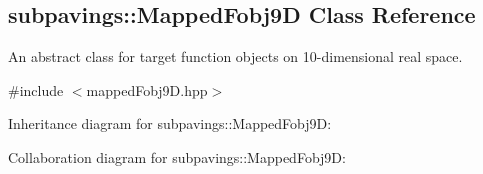 \hypertarget{classsubpavings_1_1MappedFobj9D}{\subsection{subpavings\-:\-:\-Mapped\-Fobj9\-D \-Class \-Reference}
\label{classsubpavings_1_1MappedFobj9D}
}


\-An abstract class for target function objects on 10-\/dimensional real space.  




{\ttfamily \#include $<$mapped\-Fobj9\-D.\-hpp$>$}



\-Inheritance diagram for subpavings\-:\-:\-Mapped\-Fobj9\-D\-:


\-Collaboration diagram for subpavings\-:\-:\-Mapped\-Fobj9\-D\-:
